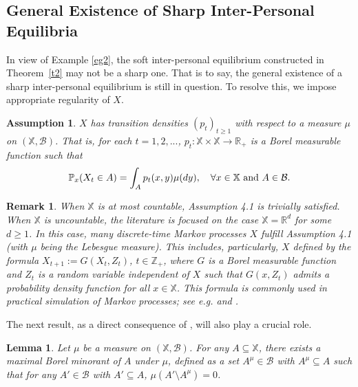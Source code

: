 \documentclass[11pt,reqno]{article}
\numberwithin{equation}{section}
\newtheorem{assumption}{Assumption}[section]
\newtheorem{lemma}{Lemma}[section]
\newtheorem{remark}{Remark}[section]
\renewcommand{\P}{\mathbb{P}}
\newcommand{\R}{\mathbb{R}}
\newcommand{\X}{\mathbb{X}}
\newcommand{\B}{\mathcal{B}}
\newcommand{\Z}{\mathbb{Z}}
\begin{document}

\subsection{General Existence of Sharp Inter-Personal Equilibria}
In view of Example \ref{eg2}, the soft inter-personal equilibrium constructed in Theorem~\ref{t2} may not be a sharp one. That is to say, the general existence of a sharp inter-personal equilibrium is still in question. To resolve this, we impose appropriate regularity of $X$.

\begin{assumption}\label{asm:density}
$X$ has transition densities $(p_t)_{t\ge 1}$ with respect to a measure $\mu$ on $(\X, \B)$. That is, for each $t=1,2,...$, $p_t: \X\times \X\to \R_+$ is a Borel measurable function %
such that
\[
\P_x(X_t\in A) = \int_A p_t(x,y) \mu(dy),\quad \forall x\in\X\ \hbox{and}\ A\in\B.
\]
\end{assumption}

\begin{remark}
When $\X$ is at most countable, Assumption 4.1 is trivially satisfied. When $\X$ is uncountable, the literature is focused on the case $\X=\R^d$ for some $d\ge 1$. In this case, many discrete-time Markov processes $X$ fulfill Assumption 4.1 (with $\mu$ being the Lebesgue measure). This includes, particularly, $X$ defined by the formula
$X_{t+1} := G(X_t,Z_t)$, $t\in \Z_+$, 
where $G$ is a Borel measurable function and $Z_t$ is a random variable independent of $X$ such that $G(x,Z_t)$ admits a probability density function for all $x\in\X$. This formula is commonly used in practical simulation of Markov processes; see e.g. \cite[Section 3]{Sart14} and \cite[Section 5]{AL11}.
\end{remark}

The next result, as a direct consequence of \cite[Lemma 6.5]{Kosorok-book-08}, will also play a crucial role.

\begin{lemma}\label{lem:minorant}
Let $\mu$ be a measure on $(\X,\B)$. For any $A\subseteq \X$, there exists a maximal Borel minorant of $A$ under $\mu$, defined as a set $A^\mu\in\B$ with $A^\mu\subseteq A$ such that for any $A'\in\B$ with $A'\subseteq A$, $\mu(A'\setminus A^\mu)=0$. %
\end{lemma}
\end{document}
